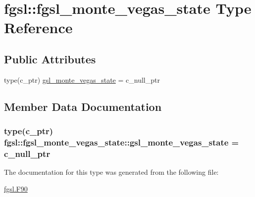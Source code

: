 \hypertarget{structfgsl_1_1fgsl__monte__vegas__state}{\section{fgsl\-:\-:fgsl\-\_\-monte\-\_\-vegas\-\_\-state Type Reference}
\label{structfgsl_1_1fgsl__monte__vegas__state}
}
\subsection*{Public Attributes}
\begin{DoxyCompactItemize}
\item 
type(c\-\_\-ptr) \hyperlink{structfgsl_1_1fgsl__monte__vegas__state_a83aa57695c0fdada3a33a46261f0e00f}{gsl\-\_\-monte\-\_\-vegas\-\_\-state} = c\-\_\-null\-\_\-ptr
\end{DoxyCompactItemize}


\subsection{Member Data Documentation}
\hypertarget{structfgsl_1_1fgsl__monte__vegas__state_a83aa57695c0fdada3a33a46261f0e00f}{
\subsubsection[{gsl\-\_\-monte\-\_\-vegas\-\_\-state}]{\setlength{\rightskip}{0pt plus 5cm}type(c\-\_\-ptr) fgsl\-::fgsl\-\_\-monte\-\_\-vegas\-\_\-state\-::gsl\-\_\-monte\-\_\-vegas\-\_\-state = c\-\_\-null\-\_\-ptr}}\label{structfgsl_1_1fgsl__monte__vegas__state_a83aa57695c0fdada3a33a46261f0e00f}


The documentation for this type was generated from the following file\-:\begin{DoxyCompactItemize}
\item 
\hyperlink{fgsl_8F90}{fgsl.\-F90}\end{DoxyCompactItemize}
